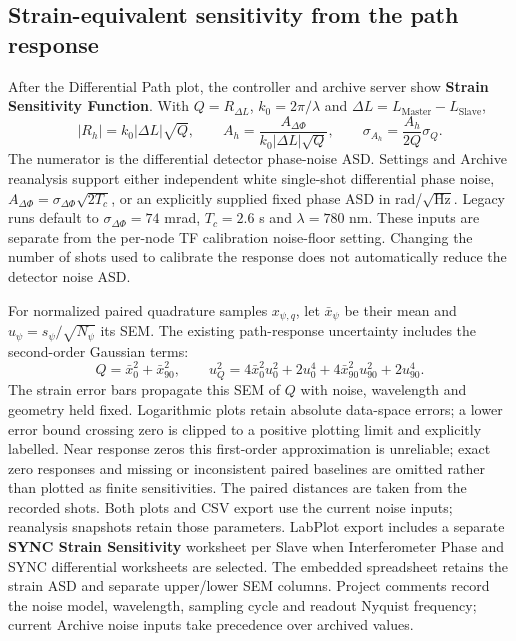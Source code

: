 \documentclass[11pt,oneside,openany]{book}
\newcommand{\ui}[1]{\textbf{#1}}
\begin{document}
\subsection{Strain-equivalent sensitivity from the path response}
After the Differential Path plot, the controller and archive server show
\ui{Strain Sensitivity Function}. With $Q=R_{\Delta L}$,
$k_0=2\pi/\lambda$ and $\Delta L=L_{\mathrm{Master}}-L_{\mathrm{Slave}}$,
\begin{equation}
 |R_h|=k_0|\Delta L|\sqrt{Q},\qquad
 A_h=\frac{A_{\Delta\Phi}}{k_0|\Delta L|\sqrt{Q}},\qquad
 \sigma_{A_h}=\frac{A_h}{2Q}\sigma_Q.
\end{equation}
The numerator is the differential detector phase-noise ASD. Settings and Archive
reanalysis support either independent white single-shot differential phase noise,
$A_{\Delta\Phi}=\sigma_{\Delta\Phi}\sqrt{2T_c}$, or an explicitly supplied fixed
phase ASD in rad/$\sqrt{\mathrm{Hz}}$. Legacy runs default to
$\sigma_{\Delta\Phi}=74$ mrad, $T_c=2.6$ s and $\lambda=780$ nm.
These inputs are separate from the per-node TF calibration noise-floor setting.
Changing the number of shots used to calibrate the response does not automatically
reduce the detector noise ASD.

For normalized paired quadrature samples $x_{\psi,q}$, let $\bar x_\psi$
be their mean and $u_\psi=s_\psi/\sqrt{N_\psi}$ its SEM. The existing path-response
uncertainty includes the second-order Gaussian terms:
\begin{equation}
 Q=\bar x_0^2+\bar x_{90}^2,\qquad
 u_Q^2=4\bar x_0^2u_0^2+2u_0^4+4\bar x_{90}^2u_{90}^2+2u_{90}^4.
\end{equation}
The strain error bars propagate this SEM of $Q$ with noise, wavelength and geometry
held fixed. Logarithmic plots retain absolute data-space errors; a lower error bound
crossing zero is clipped to a positive plotting limit and explicitly labelled.
Near response zeros this first-order approximation is unreliable; exact zero responses
and missing or inconsistent paired baselines are omitted rather than plotted as finite
sensitivities. The paired distances are taken from the recorded shots. Both plots and
CSV export use the current noise inputs; reanalysis snapshots retain those parameters.
LabPlot export includes a separate \ui{SYNC Strain Sensitivity} worksheet per Slave
when Interferometer Phase and SYNC differential worksheets are selected. The embedded
spreadsheet retains the strain ASD and separate upper/lower SEM columns. Project
comments record the noise model, wavelength, sampling cycle and readout Nyquist frequency;
current Archive noise inputs take precedence over archived values.
\end{document}
